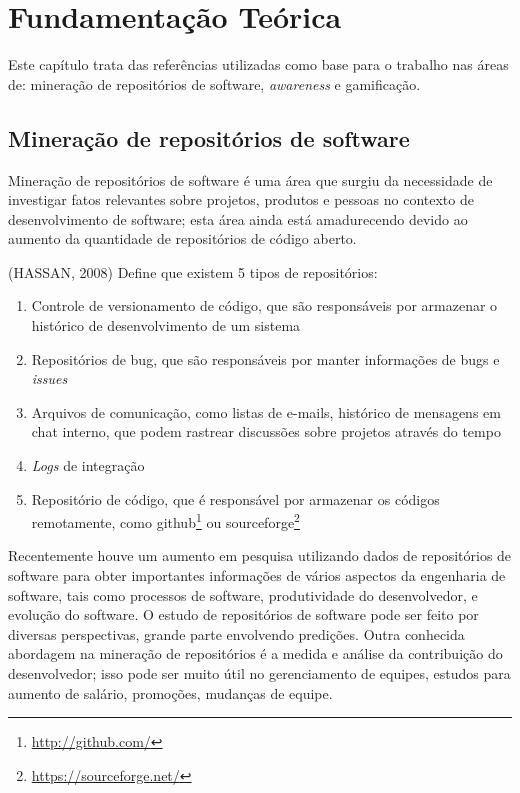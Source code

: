 \chapter[Fundamentação Teórica]{Fundamentação Teórica}
Este capítulo trata das referências utilizadas como base para o trabalho nas áreas de: mineração de repositórios de software, \textit{awareness} e gamificação.

\section{Mineração de repositórios de software} 
Mineração de repositórios de software é uma área que surgiu da necessidade de investigar fatos relevantes sobre projetos, produtos e pessoas no contexto de desenvolvimento de software; esta área ainda está amadurecendo devido ao aumento da quantidade de repositórios de código aberto. 

(HASSAN, 2008) Define que existem 5 tipos de repositórios:
\begin{enumerate}
\item Controle de versionamento de código, que são responsáveis por armazenar o histórico de desenvolvimento de um sistema
\item Repositórios de bug, que são responsáveis por manter informações de bugs e \textit{issues}
\item Arquivos de comunicação, como listas de e-mails, histórico de mensagens em chat interno, que podem rastrear discussões sobre projetos através do tempo
\item \textit{Logs} de integração 
\item Repositório de código, que é responsável por armazenar os códigos remotamente, como github\footnote{\url{http://github.com/}} ou sourceforge\footnote{\url{https://sourceforge.net/}}
\end{enumerate}
Recentemente houve um aumento em pesquisa utilizando dados de repositórios de software para obter importantes informações de vários aspectos da engenharia de software, tais como processos de software, produtividade do desenvolvedor, e evolução do software. O estudo de repositórios de software pode ser feito por diversas perspectivas, grande parte envolvendo predições. Outra conhecida abordagem na mineração de repositórios é a medida e análise da contribuição do desenvolvedor; isso pode ser muito útil no gerenciamento de equipes, estudos para aumento de salário, promoções, mudanças de equipe.
